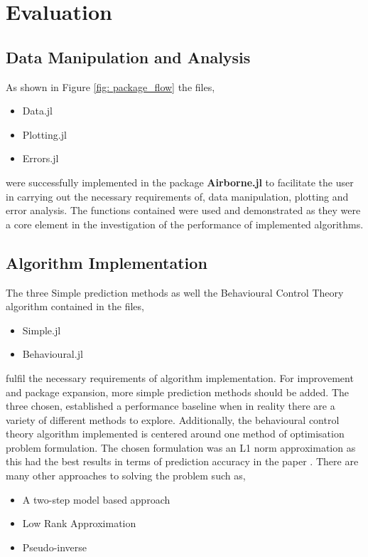 \chapter{Evaluation}
\label{chapter: Evaluation}

\section{Data Manipulation and Analysis}
As shown in Figure \ref{fig: package_flow} the files,

\begin{itemize}
    \item Data.jl
    \item Plotting.jl
    \item Errors.jl
\end{itemize}

\noindent were successfully implemented in the package \textbf{Airborne.jl} to facilitate the user in carrying out the necessary requirements of, data manipulation, plotting and error analysis. The functions contained were used and demonstrated as they were a core element in the investigation of the performance of implemented algorithms.  

\section{Algorithm Implementation}
The three Simple prediction methods as well the Behavioural Control Theory algorithm contained in the files, \begin{itemize}
    \item Simple.jl 
    \item Behavioural.jl 
\end{itemize}
fulfil the necessary requirements of algorithm implementation. For improvement and package expansion, more simple prediction methods should be added. The three chosen, established a performance baseline when in reality there are a variety of different methods to explore. Additionally, the behavioural control theory algorithm implemented is centered around one method of optimisation problem formulation. The chosen formulation was an L1 norm approximation as this had the best results in terms of prediction accuracy in the paper \cite{markovsky}. There are many other  approaches to solving the problem \cite{markovsky} such as, 

\begin{itemize}
    \item A two-step model based approach
    \item Low Rank Approximation
    \item Pseudo-inverse
\end{itemize}

